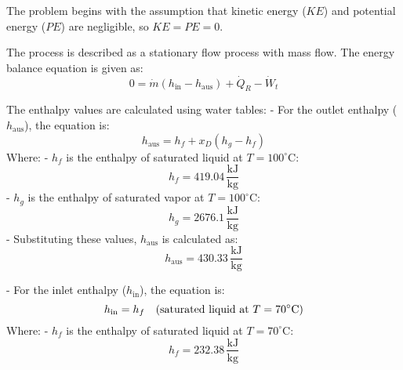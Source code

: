 The problem begins with the assumption that kinetic energy (\( KE \)) and potential energy (\( PE \)) are negligible, so \( KE = PE = 0 \).  

The process is described as a stationary flow process with mass flow. The energy balance equation is given as:  
\[
0 = \dot{m} \left( h_{\text{in}} - h_{\text{aus}} \right) + \dot{Q}_R - \dot{W}_t
\]  

The enthalpy values are calculated using water tables:  
- For the outlet enthalpy (\( h_{\text{aus}} \)), the equation is:  
\[
h_{\text{aus}} = h_f + x_D \left( h_g - h_f \right)
\]  
Where:  
  - \( h_f \) is the enthalpy of saturated liquid at \( T = 100^\circ\text{C} \):  
    \[
    h_f = 419.04 \, \frac{\text{kJ}}{\text{kg}}
    \]  
  - \( h_g \) is the enthalpy of saturated vapor at \( T = 100^\circ\text{C} \):  
    \[
    h_g = 2676.1 \, \frac{\text{kJ}}{\text{kg}}
    \]  
  - Substituting these values, \( h_{\text{aus}} \) is calculated as:  
    \[
    h_{\text{aus}} = 430.33 \, \frac{\text{kJ}}{\text{kg}}
    \]  

- For the inlet enthalpy (\( h_{\text{in}} \)), the equation is:  
\[
h_{\text{in}} = h_f \quad \text{(saturated liquid at \( T = 70^\circ\text{C} \))}  
\]  
Where:  
  - \( h_f \) is the enthalpy of saturated liquid at \( T = 70^\circ\text{C} \):  
    \[
    h_f = 232.38 \, \frac{\text{kJ}}{\text{kg}}
    \]